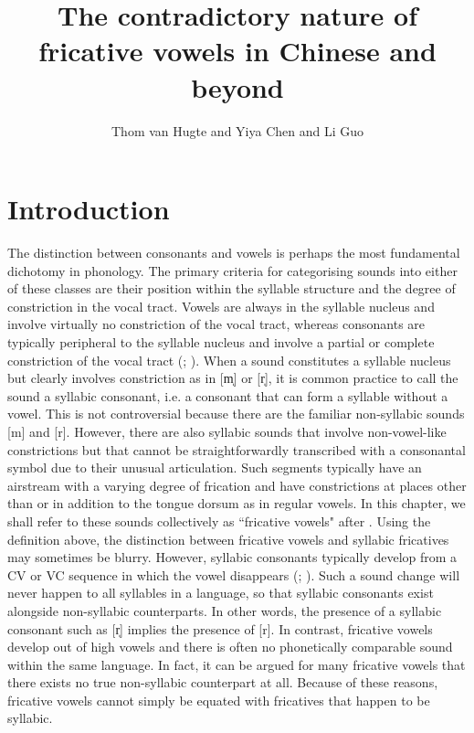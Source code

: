 \documentclass[output=paper,colorlinks,citecolor=brown,chinesefont]{langscibook}
\author{Thom van Hugte\orcid{}\affiliation{Leipzig University} and         Yiya Chen\orcid{}\affiliation{Leiden University} and        Li Guo\orcid{}\affiliation{Shanghai International Studies University}}
\title{The contradictory nature of fricative vowels in Chinese and beyond}
\begin{document}
\maketitle

\section{Introduction}
The distinction between consonants and vowels is perhaps the most fundamental dichotomy in phonology. The primary criteria for categorising sounds into either of these classes are their position within the syllable structure and the degree of constriction in the vocal tract. Vowels are always in the syllable nucleus and involve virtually no constriction of the vocal tract, whereas consonants are typically peripheral to the syllable nucleus and involve a partial or complete constriction of the vocal tract (\cite{laver_1994}; \cite{Ladefoged&Maddieson_1996}). When a sound constitutes a syllable nucleus but clearly involves constriction as in [m̩] or [r̩], it is common practice to call the sound a syllabic consonant, i.e. a consonant that can form a syllable without a vowel. This is not controversial because there are the familiar non-syllabic sounds [m] and [r]. However, there are also syllabic sounds that involve non-vowel-like constrictions but that cannot be straightforwardly transcribed with a consonantal symbol due to their unusual articulation. Such segments typically have an airstream with a varying degree of frication and have constrictions at places other than or in addition to the tongue dorsum as in regular vowels. In this chapter, we shall refer to these sounds collectively as ``fricative vowels" after \citet{Ladefoged&Maddieson_1996}. Using the definition above, the distinction between fricative vowels and syllabic fricatives may sometimes be blurry. However, syllabic consonants typically develop from a CV or VC sequence in which the vowel disappears (\cite{Scheer_2004}; \cite{Shen_2006}). Such a sound change will never happen to all syllables in a language, so that syllabic consonants exist alongside non-syllabic counterparts. In other words, the presence of a syllabic consonant such as [r̩] implies the presence of [r]. In contrast, fricative vowels develop out of high vowels and there is often no phonetically comparable sound within the same language. In fact, it can be argued for many fricative vowels that there exists no true non-syllabic counterpart at all. Because of these reasons, fricative vowels cannot simply be equated with fricatives that happen to be syllabic.
\end{document}
